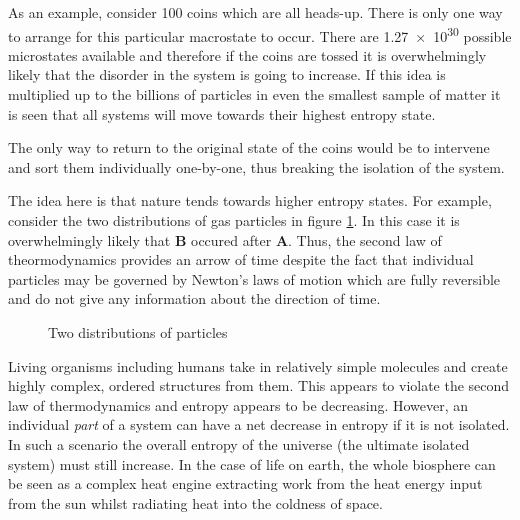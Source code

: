 \documentclass[revision-guide.tex]{subfiles}
\begin{document}
As an example, consider 100 coins which are all heads-up. There is only one way to arrange for this particular macrostate to occur. There are \num{1.27e30} possible microstates available and therefore if the coins are tossed it is overwhelmingly likely that the disorder in the system is going to increase. If this idea is multiplied up to the billions of particles in even the smallest sample of matter it is seen that all systems will move towards their highest entropy state.

The only way to return to the original state of the coins would be to intervene and sort them individually one-by-one, thus breaking the isolation of the system.


The idea here is that nature tends towards higher entropy states. For example, consider the two distributions of gas particles in figure \ref{fig:gas-distrib}. In this case it is overwhelmingly likely that \textbf{B} occured after \textbf{A}. Thus, the second law of theormodynamics provides an arrow of time despite the fact that individual particles may be governed by Newton's laws of motion which are fully reversible and do not give any information about the direction of time.

\begin{figure}[ht]
  \begin{center}\end{center}
  \caption{Two distributions of particles}
  \label{fig:gas-distrib}
\end{figure}


Living organisms including humans take in relatively simple molecules and create highly complex, ordered structures from them. This appears to violate the second law of thermodynamics and entropy appears to be decreasing. However, an individual \emph{part} of a system can have a net decrease in entropy if it is not isolated. In such a scenario the overall entropy of the universe (the ultimate isolated system) must still increase. In the case of life on earth, the whole biosphere can be seen as a complex heat engine extracting work from the heat energy input from the sun whilst radiating heat into the coldness of space.
\end{document}
